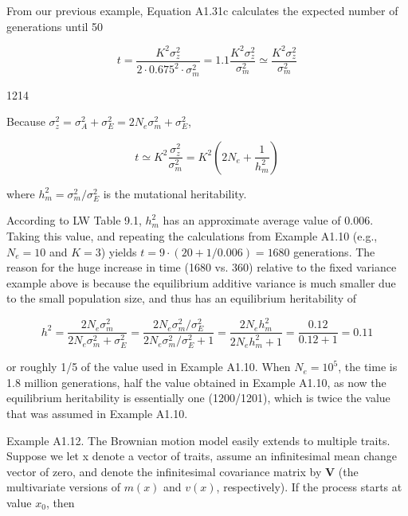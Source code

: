 \documentclass{article}
\begin{document}
From our previous example, Equation A1.31c calculates the expected number of generations until 50%

\begin{equation}
t=\frac{K^{2}\sigma_{z}^{2}}{2\cdot0.675^{2}\cdot\sigma_{m}^{2}}=1.1\frac{K^{2}\sigma_{z}^{2}}{\sigma_{m}^{2}}\simeq\frac{K^{2}\sigma_{z}^{2}}{\sigma_{m}^{2}}
\end{equation}

1214

Because  $ \sigma_{z}^{2}=\sigma_{A}^{2}+\sigma_{E}^{2}=2N_{e}\sigma_{m}^{2}+\sigma_{E}^{2} $,

\begin{equation}
t\simeq K^{2}\frac{\sigma_{z}^{2}}{\sigma_{m}^{2}}=K^{2}\left(2N_{e}+\frac{1}{h_{m}^{2}}\right)
\end{equation}

where  $ h_{m}^{2} = \sigma_{m}^{2} / \sigma_{E}^{2} $ is the mutational heritability.

According to LW Table 9.1,  $ h_m^2 $ has an approximate average value of 0.006. Taking this value, and repeating the calculations from Example A1.10 (e.g.,  $ N_e = 10 $ and  $ K = 3 $) yields  $ t = 9 \cdot (20 + 1/0.006) = 1680 $ generations. The reason for the huge increase in time (1680 vs. 360) relative to the fixed variance example above is because the equilibrium additive variance is much smaller due to the small population size, and thus has an equilibrium heritability of

\begin{equation}
h^{2}=\frac{2N_{e}\sigma_{m}^{2}}{2N_{e}\sigma_{m}^{2}+\sigma_{E}^{2}}=\frac{2N_{e}\sigma_{m}^{2}/\sigma_{E}^{2}}{2N_{e}\sigma_{m}^{2}/\sigma_{E}^{2}+1}=\frac{2N_{e}h_{m}^{2}}{2N_{e}h_{m}^{2}+1}=\frac{0.12}{0.12+1}=0.11
\end{equation}

or roughly 1/5 of the value used in Example A1.10. When  $ N_e = 10^5 $, the time is 1.8 million generations, half the value obtained in Example A1.10, as now the equilibrium heritability is essentially one (1200/1201), which is twice the value that was assumed in Example A1.10.

Example A1.12. The Brownian motion model easily extends to multiple traits. Suppose we let x denote a vector of traits, assume an infinitesimal mean change vector of zero, and denote the infinitesimal covariance matrix by  $ \mathbf{V} $ (the multivariate versions of  $ m(x) $ and  $ v(x) $, respectively). If the process starts at value  $ x_0 $, then
\end{document}
